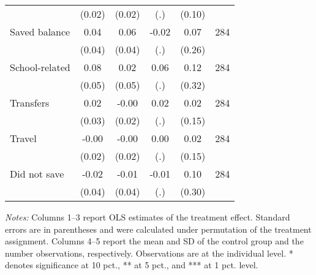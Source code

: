 \begin{table}[h]
{\begin{threeparttable}
\begin{tabular}{l*{5}{c}}
          &   (0.02)&   (0.02)&      (.)&   (0.10)&         \\
Saved balance&     0.04&     0.06&    -0.02&     0.07&      284\\
          &   (0.04)&   (0.04)&      (.)&   (0.26)&         \\
School-related&     0.08&     0.02&     0.06&     0.12&      284\\
          &   (0.05)&   (0.05)&      (.)&   (0.32)&         \\
Transfers &     0.02&    -0.00&     0.02&     0.02&      284\\
          &   (0.03)&   (0.02)&      (.)&   (0.15)&         \\
Travel    &    -0.00&    -0.00&     0.00&     0.02&      284\\
          &   (0.02)&   (0.02)&      (.)&   (0.15)&         \\
Did not save&    -0.02&    -0.01&    -0.01&     0.10&      284\\
          &   (0.04)&   (0.04)&      (.)&   (0.30)&         \\
\bottomrule \end{tabular} \begin{tablenotes}[flushleft] \footnotesize \item \emph{Notes:} Columns 1--3 report OLS estimates of the treatment effect. Standard errors are in parentheses and were calculated under permutation of the treatment assignment. Columns 4--5 report the mean and SD of the control group and the number observations, respectively. Observations are at the individual level. * denotes significance at 10 pct., ** at 5 pct., and *** at 1 pct. level. \end{tablenotes} \end{threeparttable} } \end{table}

